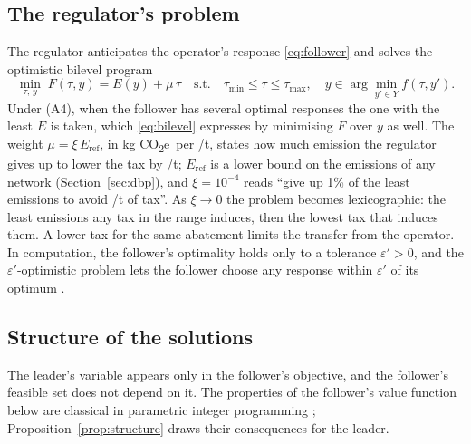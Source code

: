\documentclass[review,11pt,nonatbib]{elsarticle}
\theoremstyle{remark}
\newcommand{\tmin}{\tau_{\min}}
\newcommand{\tmax}{\tau_{\max}}
\newcommand{\Eref}{E_{\mathrm{ref}}}
\newcommand{\EUR}{\texteuro}
\newcommand{\CO}{CO\textsubscript{2}e}
\begin{document}
\subsection{The regulator's problem}\label{sec:leader}

The regulator anticipates the operator's response \eqref{eq:follower} and solves the optimistic bilevel program
\begin{equation}\label{eq:bilevel}
\min_{\tau,\, y} \; F(\tau, y) = E(y) + \mu\,\tau \quad \text{s.t.} \quad \tmin \le \tau \le \tmax, \quad y \in \arg\min_{y' \in Y} f(\tau, y'). \tag{P1}
\end{equation}
Under (A4), when the follower has several optimal responses the one with the least $E$ is taken, which \eqref{eq:bilevel} expresses by minimising $F$ over $y$ as well. The weight $\mu = \xi\,\Eref$, in kg \CO\ per \EUR/t, states how much emission the regulator gives up to lower the tax by \EUR1/t; $\Eref$ is a lower bound on the emissions of any network (Section~\ref{sec:dbp}), and $\xi = 10^{-4}$ reads ``give up 1\% of the least emissions to avoid \EUR100/t of tax''. As $\xi \to 0$ the problem becomes lexicographic: the least emissions any tax in the range induces, then the lowest tax that induces them. A lower tax for the same abatement limits the transfer from the operator. In computation, the follower's optimality holds only to a tolerance $\varepsilon' > 0$, and the $\varepsilon'$-optimistic problem lets the follower choose any response within $\varepsilon'$ of its optimum \parencite{mitsos2008global}.

\subsection{Structure of the solutions}\label{sec:structure}

The leader's variable appears only in the follower's objective, and the follower's feasible set does not depend on it. The properties of the follower's value function below are classical in parametric integer programming \parencite{geoffrion1977parametric,jenkins1982parametric}; Proposition~\ref{prop:structure} draws their consequences for the leader.
\end{document}
